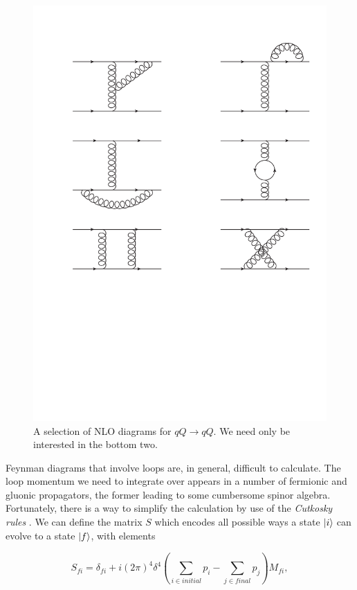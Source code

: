\begin{figure}[t]
\centering
\includegraphics[scale=0.8]{Images/qQ_nlo.pdf} 
\caption{A selection of NLO diagrams for $qQ \to qQ$. We need only be interested in the bottom two.}
\label{fig:qQnlo}
\end{figure}

Feynman diagrams that involve loops are, in general, difficult to calculate. The loop momentum we need to integrate over appears in a number of fermionic and gluonic propagators, the former leading to some cumbersome spinor algebra. Fortunately, there is a way to simplify the calculation by use of the \emph{Cutkosky rules} \cite{Cutkosky1960}. We can define the matrix $S$ which encodes all possible ways a state $\mathinner{\lvert i\rangle}_{\hspace{-0.1em}}$ can evolve to a state $\mathinner{\lvert f\rangle}_{\hspace{-0.1em}}$, with elements

\begin{equation}
S_{fi} = \delta_{fi} + i(2 \pi)^4 \delta^4 \left(\sum_{i \in initial} p_i - \sum_{j \in final} p_j \right) M_{fi},
\end{equation}

